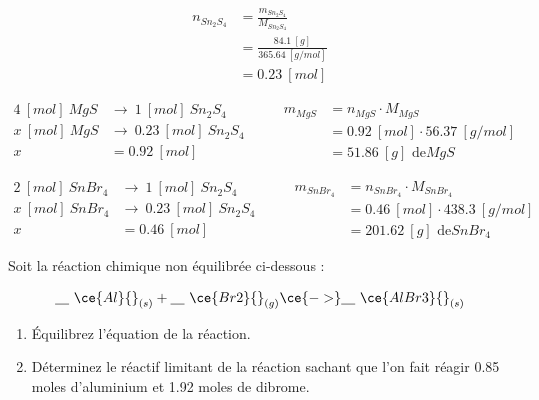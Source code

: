 \documentclass[
  11pt,
  a4paper,
  openany]{book}
\providecommand{\tightlist}{%
  \setlength{\itemsep}{0pt}\setlength{\parskip}{0pt}}
\begin{document}
\begin{Answer}
\[ \begin{split}
    n_{Sn_2S_4} &= \frac{m_{Sn_2S_4}}{M_{Sn_2S_4}} \\
    &= \frac{84.1\ [g]}{365.64\ [g/mol]} \\
    &= 0.23\ [mol]
    \end{split} \]

\[ \begin{split}
  4\ [mol]\ MgS &\rightarrow\ 1\ [mol]\ Sn_2S_4 \\
  x\ [mol]\ MgS &\rightarrow\ 0.23\ [mol]\ Sn_2S_4 \\
  x &= 0.92\ [mol]
  \end{split}
    \qquad
    \begin{split}
    m_{MgS} &= n_{MgS} \cdot M_{MgS} \\
  &= 0.92\ [mol] \cdot 56.37\ [g/mol] \\
  &= 51.86\ [g] \text{ de} MgS
  \end{split} \]

\[ \begin{split}
    2\ [mol]\ SnBr_4 &\rightarrow\ 1\ [mol]\ Sn_2S_4 \\
    x\ [mol]\ SnBr_4 &\rightarrow\ 0.23\ [mol]\ Sn_2S_4 \\
    x &= 0.46\ [mol]
    \end{split}
    \qquad
    \begin{split}
    m_{SnBr_4} &= n_{SnBr_4} \cdot M_{SnBr_4} \\
    &= 0.46\ [mol] \cdot 438.3\ [g/mol] \\
    &= 201.62\ [g] \text{ de} SnBr_4
  \end{split} \]

\end{Answer}

\begin{Exercise}

Soit la réaction chimique non équilibrée ci-dessous :

\[ \underline{\hspace{1em}}\ \ce{Al} {}_{(s)} +  \underline{\hspace{1em}}\ \ce{Br2} {}_{(g)} \ce{->}  \underline{\hspace{1em}}\ \ce{AlBr3} {}_{(s)} \]

\begin{enumerate}
\def\labelenumi{\arabic{enumi}.}
\tightlist
\item
  Équilibrez l'équation de la réaction.
\item
  Déterminez le réactif limitant de la réaction sachant que l'on fait réagir 0.85 moles d'aluminium et 1.92 moles de dibrome.
\end{enumerate}


\end{Exercise}
\end{document}
